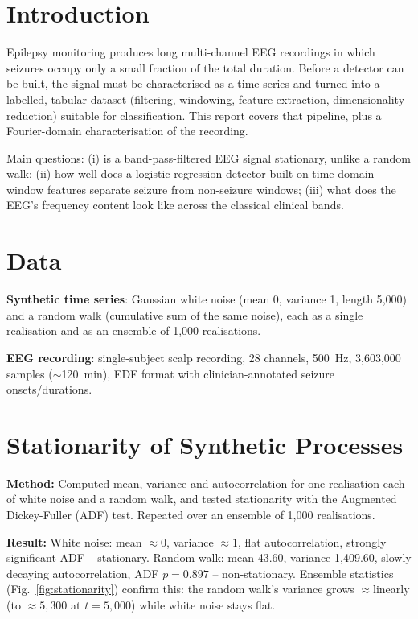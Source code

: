 ﻿\documentclass[a4paper,10pt]{article}
\begin{document}
\tableofcontents

\setlength{\parskip}{1pt}
\pagebreak
\section{Introduction}

Epilepsy monitoring produces long multi-channel EEG recordings in which seizures occupy only a small fraction of the total duration. Before a detector can be built, the signal must be characterised as a time series and turned into a labelled, tabular dataset (filtering, windowing, feature extraction, dimensionality reduction) suitable for classification. This report covers that pipeline, plus a Fourier-domain characterisation of the recording.

Main questions: (i) is a band-pass-filtered EEG signal stationary, unlike a random walk; (ii) how well does a logistic-regression detector built on time-domain window features separate seizure from non-seizure windows; (iii) what does the EEG's frequency content look like across the classical clinical bands.

\section{Data}

\textbf{Synthetic time series}: Gaussian white noise (mean 0, variance 1, length 5{,}000) and a random walk (cumulative sum of the same noise), each as a single realisation and as an ensemble of 1{,}000 realisations.

\textbf{EEG recording}: single-subject scalp recording, 28 channels, 500~Hz, 3{,}603{,}000 samples ($\sim$120~min), EDF format with clinician-annotated seizure onsets/durations.

\section{Stationarity of Synthetic Processes}
\label{sec:synth-stationarity}

\textbf{Method:} Computed mean, variance and autocorrelation for one realisation each of white noise and a random walk, and tested stationarity with the Augmented Dickey-Fuller (ADF) test. Repeated over an ensemble of 1{,}000 realisations.

\textbf{Result:} White noise: mean $\approx0$, variance $\approx1$, flat autocorrelation, strongly significant ADF -- stationary. Random walk: mean 43.60, variance 1{,}409.60, slowly decaying autocorrelation, ADF $p=0.897$ -- non-stationary. Ensemble statistics (Fig.~\ref{fig:stationarity}) confirm this: the random walk's variance grows $\approx$linearly (to $\approx5{,}300$ at $t{=}5{,}000$) while white noise stays flat.
\end{document}
